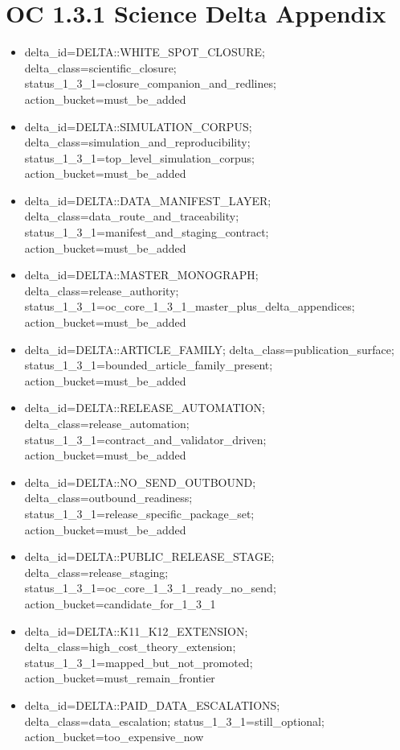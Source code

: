 \section{OC 1.3.1 Science Delta Appendix}
\begin{itemize}[leftmargin=*]
\item delta\_id=DELTA::WHITE\_SPOT\_CLOSURE; delta\_class=scientific\_closure; status\_1\_3\_1=closure\_companion\_and\_redlines; action\_bucket=must\_be\_added
\item delta\_id=DELTA::SIMULATION\_CORPUS; delta\_class=simulation\_and\_reproducibility; status\_1\_3\_1=top\_level\_simulation\_corpus; action\_bucket=must\_be\_added
\item delta\_id=DELTA::DATA\_MANIFEST\_LAYER; delta\_class=data\_route\_and\_traceability; status\_1\_3\_1=manifest\_and\_staging\_contract; action\_bucket=must\_be\_added
\item delta\_id=DELTA::MASTER\_MONOGRAPH; delta\_class=release\_authority; status\_1\_3\_1=oc\_core\_1\_3\_1\_master\_plus\_delta\_appendices; action\_bucket=must\_be\_added
\item delta\_id=DELTA::ARTICLE\_FAMILY; delta\_class=publication\_surface; status\_1\_3\_1=bounded\_article\_family\_present; action\_bucket=must\_be\_added
\item delta\_id=DELTA::RELEASE\_AUTOMATION; delta\_class=release\_automation; status\_1\_3\_1=contract\_and\_validator\_driven; action\_bucket=must\_be\_added
\item delta\_id=DELTA::NO\_SEND\_OUTBOUND; delta\_class=outbound\_readiness; status\_1\_3\_1=release\_specific\_package\_set; action\_bucket=must\_be\_added
\item delta\_id=DELTA::PUBLIC\_RELEASE\_STAGE; delta\_class=release\_staging; status\_1\_3\_1=oc\_core\_1\_3\_1\_ready\_no\_send; action\_bucket=candidate\_for\_1\_3\_1
\item delta\_id=DELTA::K11\_K12\_EXTENSION; delta\_class=high\_cost\_theory\_extension; status\_1\_3\_1=mapped\_but\_not\_promoted; action\_bucket=must\_remain\_frontier
\item delta\_id=DELTA::PAID\_DATA\_ESCALATIONS; delta\_class=data\_escalation; status\_1\_3\_1=still\_optional; action\_bucket=too\_expensive\_now
\end{itemize}
